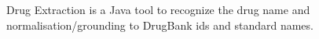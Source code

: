Drug Extraction is a Java tool to recognize the drug name and normalisation/grounding to DrugBank ids and standard names.